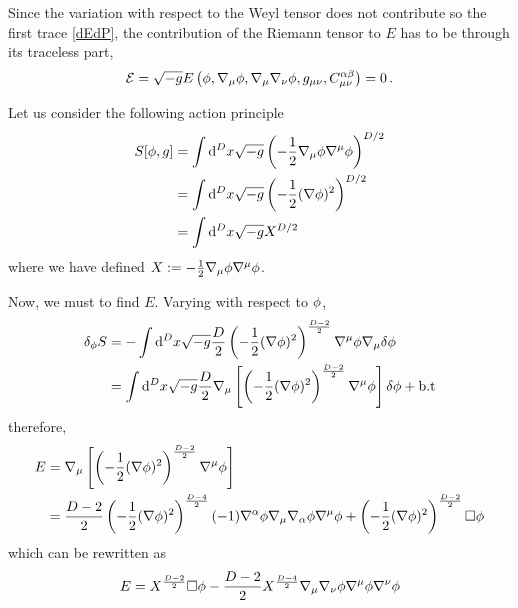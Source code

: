 Since the variation with respect to the Weyl tensor does not contribute so the first trace \eqref{dEdP}, the contribution of the Riemann tensor to $E$ has to be through its traceless part,
\begin{equation}
	\mathcal{E} =\sqrt{-g}E\left(\phi,\nabla_\mu \phi ,\nabla_\mu \nabla_\nu \phi ,g_{\mu\nu },C_{\mu\nu }^{\alpha\beta }\right)=0\,.
\end{equation}

\begin{ej}
	Let us consider the following action principle
	\begin{align}
  S[\phi,g]&=\int\dd^Dx\sqrt{-g}\left(-\frac{1}{2}\nabla_\mu \phi\nabla^\mu \phi \right)^{D/2}\\
  &=\int\dd^Dx\sqrt{-g}\left(-\frac{1}{2}(\nabla\phi )^2\right)^{D/2}\\
  &=\int\dd^Dx\sqrt{-g}X^{D/2}
\end{align}
where we have defined $X:=-\frac{1}{2}\nabla_\mu \phi\nabla^\mu \phi$. 

Now, we must to find $E$. Varying with respect to $\phi$,
\begin{align}
  \delta_\phi S&=-\int\dd^Dx\sqrt{-g}\frac{D}{2}\left(-\frac{1}{2}(\nabla\phi )^2\right)^{\frac{D-2}{2}}\nabla^\mu\phi \nabla_\mu \delta\phi \\
  &=\int\dd^Dx\sqrt{-g}\frac{D}{2}\nabla_\mu \left[\left(-\frac{1}{2}(\nabla\phi )^2\right)^{\frac{D-2}{2}}\nabla^\mu \phi \right]\delta\phi +\rm b.t
\end{align}
therefore,
\begin{align}
  E&=\nabla_\mu \left[\left(-\frac{1}{2}(\nabla\phi )^2\right)^{\frac{D-2}{2}}\nabla^\mu \phi \right]\\
  &=\frac{D-2}{2}\left(-\frac{1}{2}(\nabla\phi )^2\right)^{\frac{D-4}{2}}(-1)\nabla^\alpha \phi \nabla_\mu \nabla_\alpha\phi \nabla^\mu \phi +\left(-\frac{1}{2}(\nabla\phi )^2\right)^{\frac{D-2}{2}}\Box\phi 
\end{align}
which can be rewritten as
\begin{equation}
  E=X^{\frac{D-2}{2}}\Box\phi -\frac{D-2}{2}X^{\frac{D-4}{2}}\nabla_\mu \nabla_\nu \phi\nabla^\mu \phi\nabla^\nu \phi 
\end{equation}


\end{ej}
